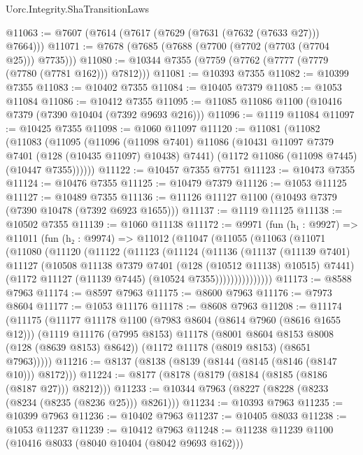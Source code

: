 \begin{lexlean}{Uorc.Integrity.ShaTransitionLaws}
\begin{coremodule}
@11063 := @7607 (@7614 (@7617 (@7629 (@7631 (@7632 (@7633 @27))) @7664)))
@11071 := @7678 (@7685 (@7688 (@7700 (@7702 (@7703 (@7704 @25))) @7735)))
@11080 := @10344 @7355 (@7759 (@7762 (@7777 (@7779 (@7780 (@7781 @162))) @7812)))
@11081 := @10393 @7355
@11082 := @10399 @7355
@11083 := @10402 @7355
@11084 := @10405 @7379
@11085 := @1053 @11084
@11086 := @10412 @7355
@11095 := @11085 @11086 @1100 (@10416 @7379 (@7390 @10404 (@7392 @9693 @216)))
@11096 := @1119 @11084
@11097 := @10425 @7355
@11098 := @1060 @11097
@11120 := @11081
    (@11082
      (@11083
        (@11095
          (@11096
            (@11098 @7401)
            @11086
            (@10431 @11097 @7379 @7401 (@128 (@10435 @11097) @10438) @7441)
            (@1172 @11086 (@11098 @7445) (@10447 @7355))))))
@11122 := @10457 @7355 @7751
@11123 := @10473 @7355
@11124 := @10476 @7355
@11125 := @10479 @7379
@11126 := @1053 @11125
@11127 := @10489 @7355
@11136 := @11126 @11127 @1100 (@10493 @7379 (@7390 @10478 (@7392 @6923 @1655)))
@11137 := @1119 @11125
@11138 := @10502 @7355
@11139 := @1060 @11138
@11172 := @9971
    (fun (h₁ : @9927) =>
    @11011
      (fun (h₂ : @9974) =>
      @11012
        (@11047
          (@11055
            (@11063
              (@11071
                (@11080
                  (@11120
                    (@11122
                      (@11123
                        (@11124
                          (@11136
                            (@11137
                              (@11139 @7401)
                              @11127
                              (@10508 @11138 @7379 @7401 (@128 (@10512 @11138) @10515) @7441)
                              (@1172 @11127 (@11139 @7445) (@10524 @7355)))))))))))))))
@11173 := @8588 @7963
@11174 := @8597 @7963
@11175 := @8600 @7963
@11176 := @7973 @8604
@11177 := @1053 @11176
@11178 := @8608 @7963
@11208 := @11174
    (@11175
      (@11177
        @11178
        @1100
        (@7983 @8604 (@8614 @7960 (@8616 @1655 @12)))
        (@1119
          @11176
          (@7995 @8153)
          @11178
          (@8001 @8604 @8153 @8008 (@128 (@8639 @8153) @8642))
          (@1172 @11178 (@8019 @8153) (@8651 @7963)))))
@11216 := @8137 (@8138 (@8139 (@8144 (@8145 (@8146 (@8147 @10))) @8172)))
@11224 := @8177 (@8178 (@8179 (@8184 (@8185 (@8186 (@8187 @27))) @8212)))
@11233 := @10344 @7963 (@8227 (@8228 (@8233 (@8234 (@8235 (@8236 @25))) @8261)))
@11234 := @10393 @7963
@11235 := @10399 @7963
@11236 := @10402 @7963
@11237 := @10405 @8033
@11238 := @1053 @11237
@11239 := @10412 @7963
@11248 := @11238 @11239 @1100 (@10416 @8033 (@8040 @10404 (@8042 @9693 @162)))

\end{coremodule}
\end{lexlean}

